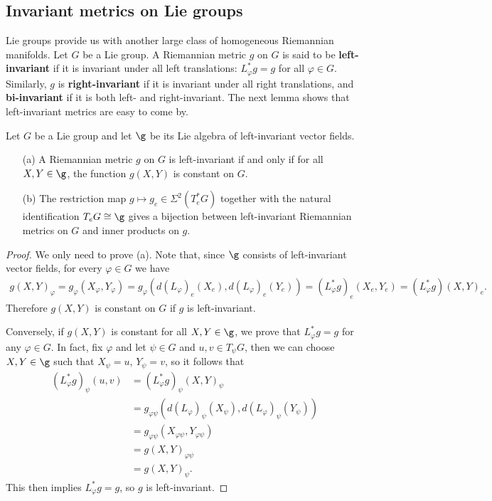 \subsection{Invariant metrics on Lie groups}
Lie groups provide us with another large class of homogeneous Riemannian manifolds. Let $G$ be 
a Lie group. A Riemannian metric $g$ on $G$ is said to be \textbf{left-invariant} if it is 
invariant under all left translations: $L^*_{\varphi}g=g$ for all $\varphi\in G$. Similarly, $g$ is 
\textbf{right-invariant} if it is invariant under all right translations, and \textbf{bi-invariant} 
if it is  both left- and right-invariant. The next lemma shows that left-invariant metrics 
are easy to come by.
\begin{lemma}\label{Riemann metric left-inv}
Let $G$ be a Lie group and let $\g$ be its Lie algebra of left-invariant vector fields.
\begin{itemize}
\item[(a)] A Riemannian metric $g$ on $G$ is left-invariant if and only if for all $X,Y\in\g$, 
the function $g(X,Y)$ is constant on $G$.
\item[(b)] The restriction map $g\mapsto g_e\in\Sigma^2(T_e^*G)$ together with the natural identification $T_eG\cong\g$ 
gives a bijection between left-invariant Riemannian metrics on $G$ and inner products on $g$.
\end{itemize}
\end{lemma}
\begin{proof}
We only need to prove (a). Note that, since $\g$ consists of left-invariant vector fields, for every $\varphi\in G$ we have
\begin{align*}
g(X,Y)_\varphi=g_{\varphi}(X_{\varphi},Y_{\varphi})=g_{\varphi}(d(L_\varphi)_e(X_e),d(L_{\varphi})_e(Y_e))=(L_\varphi^*g)_e(X_e,Y_e)=(L^*_{\varphi}g)(X,Y)_e.
\end{align*}
Therefore $g(X,Y)$ is constant on $G$ if $g$ is left-invariant.\par
Conversely, if $g(X,Y)$ is constant for all $X,Y\in\g$, we prove that $L_{\varphi}^*g=g$ for any $\varphi\in G$. In fact, fix $\varphi$ and let $\psi\in G$ and $u,v\in T_{\psi}G$, 
then we can choose $X,Y\in\g$ such that $X_{\psi}=u$, $Y_{\psi}=v$, so it follows that
\begin{align*}
(L_{\varphi}^*g)_{\psi}(u,v)&=(L_{\varphi}^*g)_{\psi}(X,Y)_{\psi}\\
&=g_{\varphi\psi}(d(L_{\varphi})_{\psi}(X_{\psi}),d(L_{\varphi})_{\psi}(Y_{\psi}))\\
&=g_{\varphi\psi}(X_{\varphi\psi},Y_{\varphi\psi})\\
&=g(X,Y)_{\varphi\psi}\\
&=g(X,Y)_{\psi}.
\end{align*}
This then implies $L_{\varphi}^*g=g$, so $g$ is left-invariant.
\end{proof}
